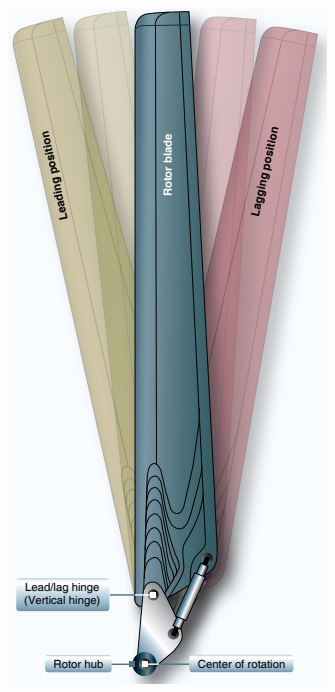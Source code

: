 \begin{figure}[H]
	\centering
	\begin{subfigure}{0.17\textwidth}
		\centering
		\includegraphics[width=\linewidth]{gambar/lead-lag.png}

\end{subfigure}
\end{figure}
